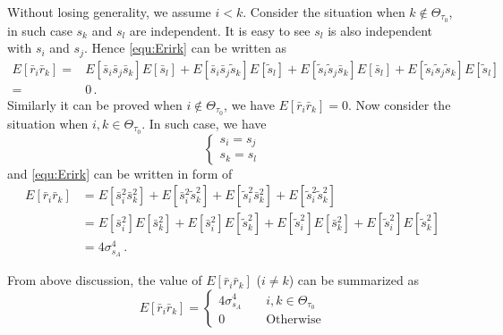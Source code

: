 Without losing generality, we assume $i < k$. Consider the situation when $k \notin \Theta_{\tau_0}$, in such case $s_k$ and $s_l$ are independent. It is easy to see $s_l$ is also independent with $s_i$ and $s_j$. Hence \eqref{equ:Erirk} can be written as
\begin{equation}
  \begin{split}
  E[\bar{r}_i\bar{r}_k] = &E[\bar{s}_i\bar{s}_j\bar{s}_k]E[\bar{s}_l] + E[\bar{s}_i\bar{s}_j\tilde{s}_k]E[\tilde{s}_l] + E[\tilde{s}_i\tilde{s}_j\bar{s}_k]E[\bar{s}_l] + E[\tilde{s}_i\tilde{s}_j\tilde{s}_k]E[\tilde{s}_l]\\
  = &0\,.
\end{split}
  \label{equ:Erirksitu1}
\end{equation} 
Similarly it can be proved when $i \notin \Theta_{\tau_0}$, we have $E[\bar{r}_i\bar{r}_k] =0$. Now consider the situation when $i, k \in \Theta_{\tau_0}$. In such case, we have 
\begin{equation}
  \begin{cases}
    s_i = s_j\\
    s_k = s_l
  \end{cases}
\end{equation}
and \eqref{equ:Erirk} can be written in form of
\begin{equation}
  \begin{split}
    E[\bar{r}_i\bar{r}_k] &= E[\bar{s}_i^2\bar{s}_k^2] + E[\bar{s}_i^2\tilde{s}_k^2]  +E[\tilde{s}_i^2\bar{s}_k^2] + E[\tilde{s}_i^2\tilde{s}_k^2] \\
    &= E[\bar{s}_i^2]E[\bar{s}_k^2] + E[\bar{s}_i^2]E[\tilde{s}_k^2]  +E[\tilde{s}_i^2]E[\bar{s}_k^2] + E[\tilde{s}_i^2]E[\tilde{s}_k^2] \\
    &= 4\sigma_{s_A}^4\,.
  \end{split}
  \label{Eririsitu2}
\end{equation}

From above discussion, the value of $E[\bar{r}_i\bar{r}_k]$  ($i \neq k$) can be summarized as
\begin{equation}
  E[\bar{r}_i\bar{r}_k] =  \begin{cases}
    4\sigma_{s_A}^4 \;\;\;\;&i, k \in \Theta_{\tau_0}\\
    0\;\;\;\;&\text{Otherwise}
  \end{cases}
  \label{Er_ir_j}
\end{equation}

